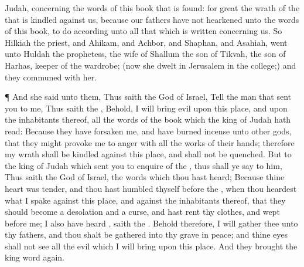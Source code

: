 {Judah, concerning the
words of this
book that is
found: for
great
{} the
wrath of the
{} that is
kindled against us, because our
fathers have not
hearkened unto the
words of this
book, to
do according unto all that which is
written concerning us.
So
Hilkiah the
priest, and
Ahikam, and
Achbor, and
Shaphan, and
Asahiah,
went unto
Huldah the
prophetess, the
wife of
Shallum the
son of
Tikvah, the
son of
Harhas,
keeper of the
wardrobe; (now she
dwelt in
Jerusalem in the
college;) and they
communed with her.
\par }{\PP {}¶ And she
said unto them, Thus
saith the
{}
God of
Israel,
Tell the
man that
sent you to me,
Thus
saith the
{}, Behold, I will
bring
evil upon this
place, and upon the
inhabitants thereof,
{} all the
words of the
book which the
king of
Judah hath
read:
Because they have
forsaken me, and have burned
incense unto
other
gods, that they might provoke me to
anger with all the
works of their
hands; therefore my
wrath shall be
kindled against this
place, and shall not be
quenched.
But to the
king of
Judah which
sent you to
enquire of the
{}, thus shall ye
say to him, Thus
saith the
{}
God of
Israel,
{} the
words which thou hast
heard;
Because thine
heart was
tender, and thou hast
humbled thyself
before the
{}, when thou
heardest what I
spake against this
place, and against the
inhabitants thereof, that they should become a
desolation and a
curse, and hast
rent thy
clothes, and
wept
before me; I also have
heard
{},
saith the
{}.
Behold therefore, I will
gather thee unto thy
fathers, and thou shalt be
gathered into thy
grave in
peace; and thine
eyes shall not
see all the
evil which I will
bring upon this
place. And they
brought the
king
word
again.

}

